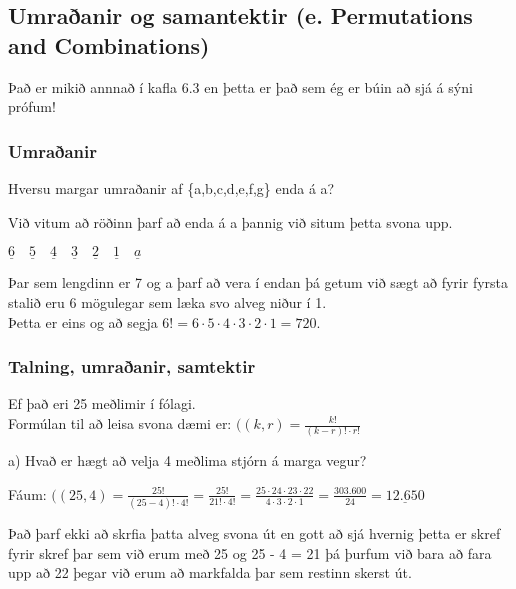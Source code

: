 \subsection{Umraðanir og samantektir (e. Permutations and Combinations)}
Það er mikið annnað í kafla 6.3 en þetta er það sem ég er búin að sjá á sýni prófum!
\subsubsection{Umraðanir}
Hversu margar umraðanir af \{a,b,c,d,e,f,g\} enda á a?\vspace*{0.5em}

Við vitum að röðinn þarf að enda á a þannig við situm þetta svona upp.\vspace*{0.5em}

$\underline{6}\quad\underline{5}\quad\underline{4}\quad\underline{3}\quad\underline{2}\quad\underline{1}\quad\underline{a}$\vspace*{0.5em}

Þar sem lengdinn er 7 og a þarf að vera í endan þá getum við sægt að fyrir \hspace*{1.3em}fyrsta stalið eru 6 mögulegar sem læka svo alveg niður í 1.\\
\hspace*{1.3em}Þetta er eins og að segja $6! = 6 \cdot 5 \cdot 4 \cdot 3 \cdot 2 \cdot 1 = 720$.

\subsubsection{Talning, umraðanir, samtektir}
Ef það eri 25 meðlimir í fólagi.\\
Formúlan til að leisa svona dæmi er: $((k,r) = \frac{k!}{(k-r)! \cdot r!}$\vspace*{0.5em}

a) Hvað er hægt að velja 4 meðlima stjórn á marga vegur?\vspace*{0.3em}

Fáum: $((25,4) = \frac{25!}{(25-4)! \cdot 4!} = \frac{25!}{21! \cdot 4!} = \frac{25 \cdot 24 \cdot 23 \cdot 22}{4 \cdot 3 \cdot 2 \cdot 1} = \frac{303.600}{24} = \underline{12.650}$\vspace*{0.5em}

Það þarf ekki að skrfia þatta alveg svona út en gott að sjá hvernig þetta er skref \hspace*{1.3em}fyrir skref þar sem við erum með 25 og 25 - 4 = 21 þá þurfum við bara að fara \hspace*{1.3em}upp að 22 þegar við erum að markfalda þar sem restinn skerst út.\vspace*{0.5em}

